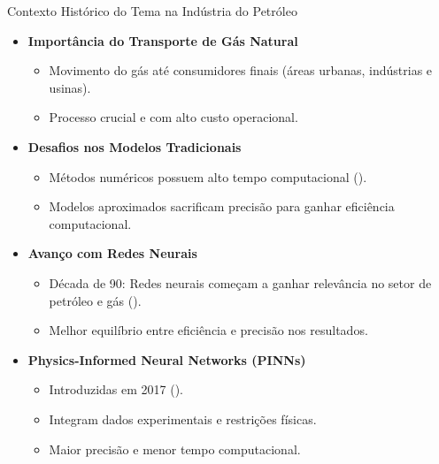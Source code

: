 \begin{frame}{Contexto Histórico do Tema na Indústria do Petróleo}
    \begin{itemize}
        \item \textbf{Importância do Transporte de Gás Natural}
        \begin{itemize}
            \item Movimento do gás até consumidores finais (áreas urbanas, indústrias e usinas). 
            \item Processo crucial e com alto custo operacional. 
        \end{itemize}

        \item \textbf{Desafios nos Modelos Tradicionais} 
        \begin{itemize}
            \item Métodos numéricos possuem alto tempo computacional (\cite{MARFATIA2022100030}). 
            \item Modelos aproximados sacrificam precisão para ganhar eficiência computacional. 
        \end{itemize}

        \item \textbf{Avanço com Redes Neurais} 
        \begin{itemize}
            \item Década de 90: Redes neurais começam a ganhar relevância no setor de petróleo e gás (\cite{Mohaghegh1996}). 
            \item Melhor equilíbrio entre eficiência e precisão nos resultados. 
        \end{itemize}

        \item \textbf{Physics-Informed Neural Networks (PINNs)} 
        \begin{itemize}
            \item Introduzidas em 2017 (\cite{Raissi2017}). 
            \item Integram dados experimentais e restrições físicas. 
            \item Maior precisão e menor tempo computacional. 
        \end{itemize}
    \end{itemize}
\end{frame}
